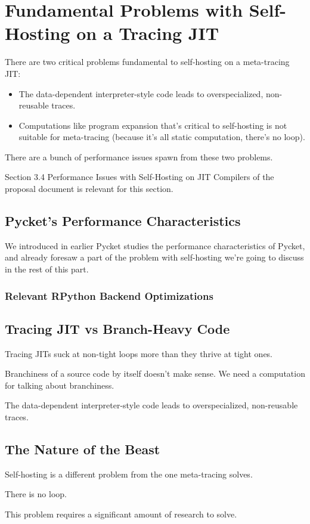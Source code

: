 \chapter{Fundamental Problems with Self-Hosting on a Tracing JIT}

	\label{chapter:problem}

	\begin{chapterpoint}
		There are two critical problems fundamental to self-hosting on a meta-tracing JIT:
		\begin{itemize}
			\item The data-dependent interpreter-style code leads to overspecialized, non-reusable traces.
			\item Computations like program expansion that's critical to self-hosting is not suitable for meta-tracing (because it's all static computation, there's no loop).
		\end{itemize}
		There are a bunch of performance issues spawn from these two problems.
	\end{chapterpoint}

	\begin{todo}[Import]
			Section 3.4 Performance Issues with Self-Hosting on JIT Compilers of the proposal document is relevant for this section.
	\end{todo}

	\section{Pycket's Performance Characteristics}
        \begin{mainpoint}
            We introduced in earlier Pycket studies the performance characteristics of Pycket, and already foresaw a part of the problem with self-hosting we're going to discuss in the rest of this part.
        \end{mainpoint}

        \subsection{Relevant RPython Backend Optimizations}

	\section{Tracing JIT vs Branch-Heavy Code}
		\begin{mainpoint}
		 	Tracing JITs suck at non-tight loops more than they thrive at tight ones.

			Branchiness of a source code by itself doesn't make sense. We need a computation for talking about branchiness.

			The data-dependent interpreter-style code leads to overspecialized, non-reusable traces.
		\end{mainpoint}

	\section{The Nature of the Beast}
		\begin{mainpoint}
			Self-hosting is a different problem from the one meta-tracing solves.

			There is no loop.

			This problem requires a significant amount of research to solve.
		\end{mainpoint}
